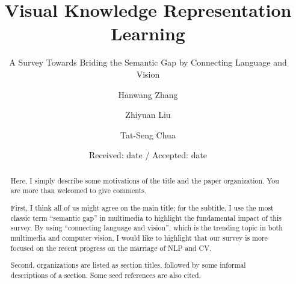 \title{Visual Knowledge Representation Learning
}
\subtitle{A Survey Towards Briding the Semantic Gap by Connecting Language and Vision}

\author{Hanwang Zhang         \and
        Zhiyuan Liu\and
        Tat-Seng Chua
}


\date{Received: date / Accepted: date}


\maketitle

\begin{abstract}
Here, I simply describe some motivations of the title and the paper organization. You are more than welcomed to give comments.

First, I think all of us might agree on the main title; for the subtitle, I use the most classic term ``semantic gap'' in multimedia to highlight the fundamental impact of this survey. By using ``connecting language and vision'', which is the trending topic in both multimedia and computer vision, I would like to highlight that our survey is more focused on the recent progress on the marriage of NLP and CV.

Second, organizations are listed as section titles, followed by some informal descriptions of a section. Some seed references are also cited.

\end{abstract}

